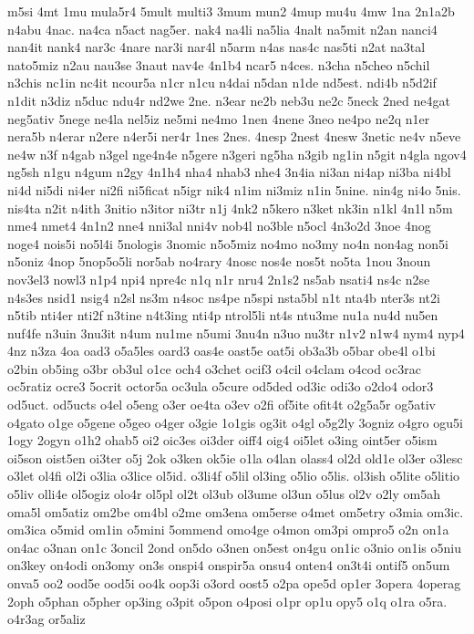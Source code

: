 {m5si
4mt
1mu
mula5r4
5mult
multi3
3mum
mun2
4mup
mu4u
4mw
1na
2n1a2b
n4abu
4nac.
na4ca
n5act
nag5er.
nak4
na4li
na5lia
4nalt
na5mit
n2an
nanci4
nan4it
nank4
nar3c
4nare
nar3i
nar4l
n5arm
n4as
nas4c
nas5ti
n2at
na3tal
nato5miz
n2au
nau3se
3naut
nav4e
4n1b4
ncar5
n4ces.
n3cha
n5cheo
n5chil
n3chis
nc1in
nc4it
ncour5a
n1cr
n1cu
n4dai
n5dan
n1de
nd5est.
ndi4b
n5d2if
n1dit
n3diz
n5duc
ndu4r
nd2we
2ne.
n3ear
ne2b
neb3u
ne2c
5neck
2ned
ne4gat
neg5ativ
5nege
ne4la
nel5iz
ne5mi
ne4mo
1nen
4nene
3neo
ne4po
ne2q
n1er
nera5b
n4erar
n2ere
n4er5i
ner4r
1nes
2nes.
4nesp
2nest
4nesw
3netic
ne4v
n5eve
ne4w
n3f
n4gab
n3gel
nge4n4e
n5gere
n3geri
ng5ha
n3gib
ng1in
n5git
n4gla
ngov4
ng5sh
n1gu
n4gum
n2gy
4n1h4
nha4
nhab3
nhe4
3n4ia
ni3an
ni4ap
ni3ba
ni4bl
ni4d
ni5di
ni4er
ni2fi
ni5ficat
n5igr
nik4
n1im
ni3miz
n1in
5nine.
nin4g
ni4o
5nis.
nis4ta
n2it
n4ith
3nitio
n3itor
ni3tr
n1j
4nk2
n5kero
n3ket
nk3in
n1kl
4n1l
n5m
nme4
nmet4
4n1n2
nne4
nni3al
nni4v
nob4l
no3ble
n5ocl
4n3o2d
3noe
4nog
noge4
nois5i
no5l4i
5nologis
3nomic
n5o5miz
no4mo
no3my
no4n
non4ag
non5i
n5oniz
4nop
5nop5o5li
nor5ab
no4rary
4nosc
nos4e
nos5t
no5ta
1nou
3noun
nov3el3
nowl3
n1p4
npi4
npre4c
n1q
n1r
nru4
2n1s2
ns5ab
nsati4
ns4c
n2se
n4s3es
nsid1
nsig4
n2sl
ns3m
n4soc
ns4pe
n5spi
nsta5bl
n1t
nta4b
nter3s
nt2i
n5tib
nti4er
nti2f
n3tine
n4t3ing
nti4p
ntrol5li
nt4s
ntu3me
nu1a
nu4d
nu5en
nuf4fe
n3uin
3nu3it
n4um
nu1me
n5umi
3nu4n
n3uo
nu3tr
n1v2
n1w4
nym4
nyp4
4nz
n3za
4oa
oad3
o5a5les
oard3
oas4e
oast5e
oat5i
ob3a3b
o5bar
obe4l
o1bi
o2bin
ob5ing
o3br
ob3ul
o1ce
och4
o3chet
ocif3
o4cil
o4clam
o4cod
oc3rac
oc5ratiz
ocre3
5ocrit
octor5a
oc3ula
o5cure
od5ded
od3ic
odi3o
o2do4
odor3
od5uct.
od5ucts
o4el
o5eng
o3er
oe4ta
o3ev
o2fi
of5ite
ofit4t
o2g5a5r
og5ativ
o4gato
o1ge
o5gene
o5geo
o4ger
o3gie
1o1gis
og3it
o4gl
o5g2ly
3ogniz
o4gro
ogu5i
1ogy
2ogyn
o1h2
ohab5
oi2
oic3es
oi3der
oiff4
oig4
oi5let
o3ing
oint5er
o5ism
oi5son
oist5en
oi3ter
o5j
2ok
o3ken
ok5ie
o1la
o4lan
olass4
ol2d
old1e
ol3er
o3lesc
o3let
ol4fi
ol2i
o3lia
o3lice
ol5id.
o3li4f
o5lil
ol3ing
o5lio
o5lis.
ol3ish
o5lite
o5litio
o5liv
olli4e
ol5ogiz
olo4r
ol5pl
ol2t
ol3ub
ol3ume
ol3un
o5lus
ol2v
o2ly
om5ah
oma5l
om5atiz
om2be
om4bl
o2me
om3ena
om5erse
o4met
om5etry
o3mia
om3ic.
om3ica
o5mid
om1in
o5mini
5ommend
omo4ge
o4mon
om3pi
ompro5
o2n
on1a
on4ac
o3nan
on1c
3oncil
2ond
on5do
o3nen
on5est
on4gu
on1ic
o3nio
on1is
o5niu
on3key
on4odi
on3omy
on3s
onspi4
onspir5a
onsu4
onten4
on3t4i
ontif5
on5um
onva5
oo2
ood5e
ood5i
oo4k
oop3i
o3ord
oost5
o2pa
ope5d
op1er
3opera
4operag
2oph
o5phan
o5pher
op3ing
o3pit
o5pon
o4posi
o1pr
op1u
opy5
o1q
o1ra
o5ra.
o4r3ag
or5aliz
}
